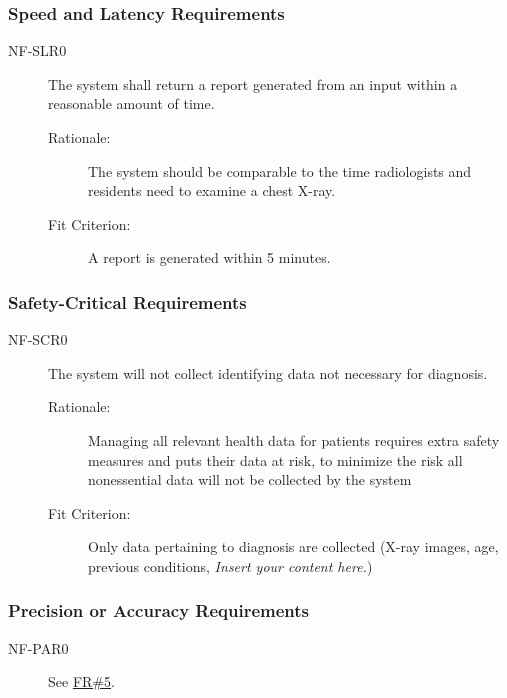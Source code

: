 \documentclass[12pt]{article}
\newcommand{\lips}{\textit{Insert your content here.}}
\begin{document}
\subsubsection{Speed and Latency Requirements}
\begin{description}
    \item[NF-SLR0] The system shall return a report generated from an input within a reasonable amount of time. 
    \begin{description}
        \item[Rationale:] The system should be comparable to the time radiologists and residents need to examine a chest X-ray.  
        \item[Fit Criterion:] A report is generated within 5 minutes.
    \end{description}
\end{description}

\subsubsection{Safety-Critical Requirements}
\begin{description}
    \item[NF-SCR0]The system will not collect identifying data not necessary for diagnosis.
    \begin{description}
        \item[Rationale:] Managing all relevant health data for patients requires extra safety measures and puts their data at risk, to minimize the risk all nonessential data will not be collected by the system
        \item[Fit Criterion:] Only data pertaining to diagnosis are collected (X-ray images, age, previous conditions, \lips)
    \end{description}
\end{description}

\subsubsection{Precision or Accuracy Requirements}
\begin{description}
    \item[NF-PAR0] See \hyperlink{FR5}{FR\#5}.
\end{description}
\end{document}
